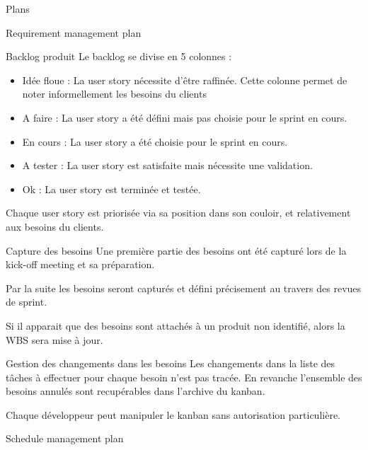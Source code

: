 \documentclass[]{article}
\begin{document}
\begin{section}{Plans}
\begin{subsection}{Requirement management plan}
\begin{subsubsection}{Backlog produit}
         Le backlog se divise en 5 colonnes :
         \begin{itemize}
             \item Idée floue : La user story nécessite d'être raffinée. Cette colonne permet de noter informellement les besoins du clients
             \item A faire : La user story a été défini mais pas choisie pour le sprint en cours.
             \item En cours : La user story a été choisie pour le sprint en cours.
             \item A tester : La user story est satisfaite mais nécessite une validation.
             \item Ok : La user story est terminée et testée.
         \end{itemize}

         Chaque user story est priorisée via sa position dans son couloir, et relativement aux besoins du clients.

     \end{subsubsection}

     \begin{subsubsection}{Capture des besoins}
         Une première partie des besoins ont été capturé lors de la kick-off meeting et sa préparation.

         Par la suite les besoins seront capturés et défini précisement au travers des revues de sprint.

         Si il apparait que des besoins sont attachés à un produit non identifié, alors la WBS sera mise à jour.
     \end{subsubsection}

     \begin{subsubsection}{Gestion des changements dans les besoins}
         Les changements dans la liste des tâches à effectuer pour chaque besoin n'est pas tracée.
         En revanche l'ensemble des besoins annulés sont recupérables dans l'archive du kanban.

         Chaque développeur peut manipuler le kanban sans autorisation particulière.
     \end{subsubsection}

 \end{subsection}

 \begin{subsection}{Schedule management plan}

 \end{subsection}


\end{section}
\end{document}
